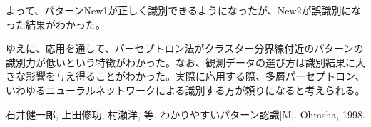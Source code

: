 \documentclass[ %
  uplatex,%
  papersize%
]{jsarticle}
\begin{document}
よって、パターンNew1が正しく識別できるようになったが、New2が誤識別になった結果がわかった。


ゆえに、応用を通して、パーセプトロン法がクラスター分界線付近のパターンの識別力が低いという特徴がわかった。なお、観測データの選び方は識別結果に大きな影響を与え得ることがわかった。実際に応用する際、多層パーセプトロン、いわゆるニューラルネットワークによる識別する方が頼りになると考えられる。

\begin{thebibliography}{9}
     石井健一郎, 上田修功, 村瀬洋, 等. わかりやすいパターン認識[M]. Ohmsha, 1998.
\end{thebibliography}
\end{document}
